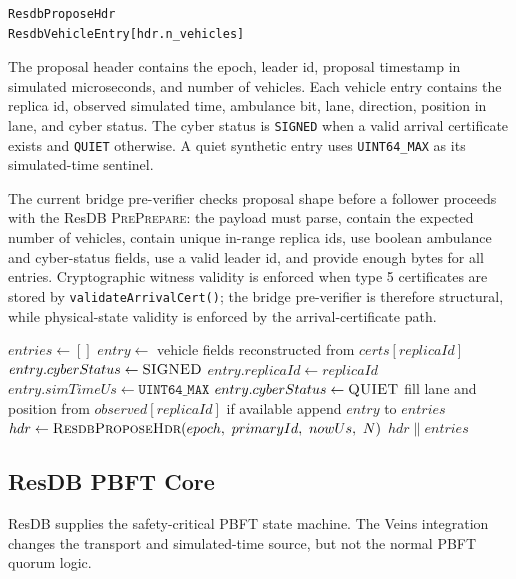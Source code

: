 \documentclass[fleqn,10pt]{olplainarticle}
\begin{document}
\begin{verbatim}
ResdbProposeHdr
ResdbVehicleEntry[hdr.n_vehicles]
\end{verbatim}

\noindent The proposal header contains the epoch, leader id, proposal timestamp in simulated microseconds, and number of vehicles. Each vehicle entry contains the replica id, observed simulated time, ambulance bit, lane, direction, position in lane, and cyber status. The cyber status is \texttt{SIGNED} when a valid arrival certificate exists and \texttt{QUIET} otherwise. A quiet synthetic entry uses \texttt{UINT64\_MAX} as its simulated-time sentinel.

The current bridge pre-verifier checks proposal shape before a follower proceeds with the ResDB \textsc{PrePrepare}: the payload must parse, contain the expected number of vehicles, contain unique in-range replica ids, use boolean ambulance and cyber-status fields, use a valid leader id, and provide enough bytes for all entries. Cryptographic witness validity is enforced when type 5 certificates are stored by \texttt{validateArrivalCert()}; the bridge pre-verifier is therefore structural, while physical-state validity is enforced by the arrival-certificate path.

\begin{algorithm}[H]
\caption{\textsc{BuildResDBProposal}$(certs,\ observed,\ N,\ epoch)$}
\begin{algorithmic}[1]
\State $entries \gets []$
        \State $entry \gets$ vehicle fields reconstructed from $certs[replicaId]$
        \State $entry.cyberStatus \gets \textsc{SIGNED}$
    \Else
        \State $entry.replicaId \gets replicaId$
        \State $entry.simTimeUs \gets \texttt{UINT64\_MAX}$
        \State $entry.cyberStatus \gets \textsc{QUIET}$
        \State fill lane and position from $observed[replicaId]$ if available
    \EndIf
\State append $entry$ to $entries$
\EndFor
\State $hdr \gets \textsc{ResdbProposeHdr}(epoch,\ primaryId,\ nowUs,\ N)$
\State \Return $hdr \| entries$
\end{algorithmic}
\end{algorithm}

\subsection{ResDB PBFT Core}
\label{subsec:resdb-pbft-core}

ResDB supplies the safety-critical PBFT state machine. The Veins integration changes the transport and simulated-time source, but not the normal PBFT quorum logic.
\end{document}
